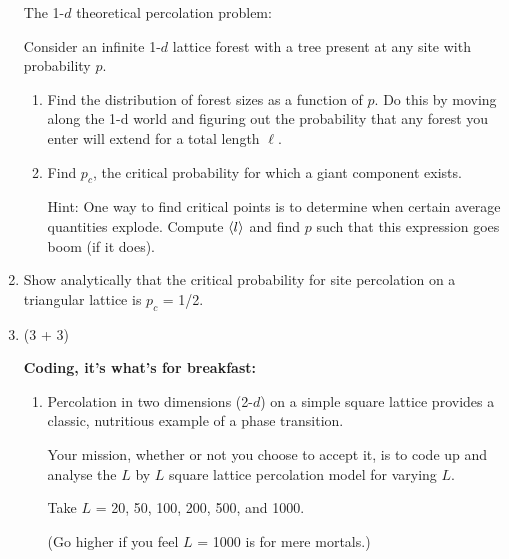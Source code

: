 \begin{enumerate}
  The 1-$d$ theoretical percolation problem:

  Consider an infinite 1-$d$ lattice forest with 
  a tree present at any site with probability $p$.

  \begin{enumerate}
  \item 
    Find the distribution of forest sizes
    as a function of $p$.
    Do this by moving along the 1-d world and
    figuring out 
    the probability
    that any forest you enter will extend for a total length $\ell$.
  \item 
    Find $p_c$, the critical probability for
    which a giant component exists.

    Hint: One way to find critical points is
    to determine when certain average quantities explode.
    Compute $\langle l\rangle$ and find $p$ such that this
    expression goes boom (if it does).
  \end{enumerate}

  
   \solutionstart


   \solutionend

\item

  Show analytically that the critical probability for
  site percolation on a triangular lattice
  is $p_c$ = 1/2.


  
   \solutionstart


   \solutionend

\item (3 + 3)

  \textbf{Coding, it's what's for breakfast:}

  \begin{enumerate}
  \item 
    Percolation in two dimensions (2-$d$) on a simple square lattice provides a classic, nutritious 
    example of a phase transition.

    Your mission, whether or not you choose to accept it,
    is to code up and analyse the $L$ by $L$ square lattice percolation model
    for varying $L$.

    Take $L$ = 20, 50, 100, 200, 500, and 1000.
    
    (Go higher if you feel $L$ = 1000 is for mere mortals.)


\end{enumerate}
\end{enumerate}

